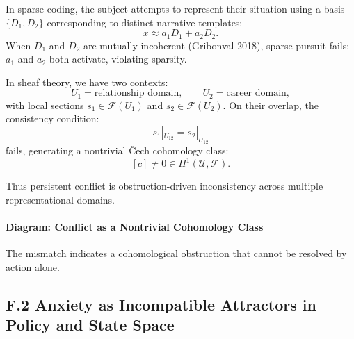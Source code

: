 \documentclass[11pt,a4paper,twoside]{article}
\begin{document}
In sparse coding, the subject attempts to represent their situation using a basis $\{D_1, D_2\}$ corresponding to distinct narrative templates:
\[
x \approx a_1 D_1 + a_2 D_2.
\]
When $D_1$ and $D_2$ are mutually incoherent (Gribonval 2018), sparse pursuit fails: $a_1$ and $a_2$ both activate, violating sparsity.

In sheaf theory, we have two contexts:
\[
U_1 = \text{relationship domain},\qquad U_2 = \text{career domain},
\]
with local sections $s_1\in \mathscr{F}(U_1)$ and $s_2\in \mathscr{F}(U_2)$.
On their overlap, the consistency condition:
\[
s_1|_{U_{12}} = s_2|_{U_{12}}
\]
fails, generating a nontrivial Čech cohomology class:
\[
[c] \neq 0 \in H^1(\mathcal{U},\mathscr{F}).
\]

Thus persistent conflict is obstruction-driven inconsistency across multiple representational domains.

\paragraph{Diagram: Conflict as a Nontrivial Cohomology Class}

\begin{center}
\end{center}

The mismatch indicates a cohomological obstruction that cannot be resolved by action alone.

\subsection*{F.2 Anxiety as Incompatible Attractors in Policy and State Space}
\end{document}
